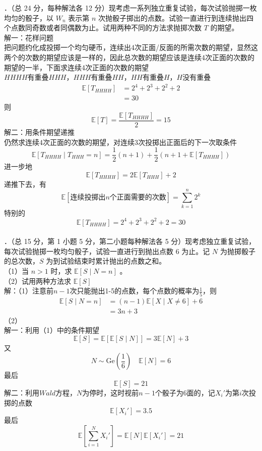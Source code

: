 \documentclass[UTF8]{ctexart}
\begin{document}
．（总 24 分，每种解法各 12 分）现考虑一系列独立重复试验，每次试验抛掷一枚均匀的骰子，以 $W_{n}$ 表示第 $n$ 次抛骰子掷出的点数。试验一直进行到连续抛出四个点数同奇数或者同偶数为止。试用两种不同的方法求抛掷次数 $T$ 的期望。\\
解一：花样问题\\
把问题约化成投掷一个均匀硬币，连续出4次正面/反面的所需次数的期望，显然这两个的次数的期望应该是一样的，因此总次数的期望应该是连续4次正面的次数的期望的一半，下面求连续4次正面的次数的期望\\
$HHHH$有重叠$HHH$，$HHH$有重叠$HH$，$HH$有重叠$H$，$H$没有重叠
\begin{align*}
	\mathbb{E}[T_{HHHH}] & =2^4+2^3+2^2+2 \\
	&=30
\end{align*}
则
\[
\mathbb{E}[T]=\frac{\mathbb{E}[T_{HHHH}]}{2}=15
\]
解二：用条件期望递推\\
仍然求连续4次正面的次数的期望，对连续3次投掷出正面后的下一次取条件
\[
	\mathbb{E}[T_{HHHH}\mid T_{HHH}=n] = \frac{1}{2}(n+1)+\frac{1}{2}\left(n+1+\mathbb{E}[T_{HHHH}] \right)
\]  
进一步地
\[
\mathbb{E}[T_{HHHH}]=2\mathbb{E}\left[T_{HHH} \right]+2 
\]
递推下去，有
\[
\mathbb{E}[\text{连续投掷出}n\text{个正面需要的次数}]=\sum_{k=1}^n 2^k
\]
特别的
\[
\mathbb{E}[T_{HHHH}]=2^4+2^3+2^2+2=30
\]\\



．（总 15 分，第 1 小题 5 分，第二小题每种解法各 5 分）现考虑独立重复试验，每次试验抛掷一枚均匀骰子，试验一直进行到抛出点数 6 为止。记 $N$ 为抛掷骰子的总次数，$S$ 为到试验结束时累计抛出的点数之和。\\
（1）当 $n>1$ 时，求 $\mathbb{E}[S \mid N=n]$ 。\\
（2）试用两种方法求 $\mathbb{E}[S]$\\ 
解：（1）注意前$n-1$次只能抛出1-5的点数，每个点数的概率为$\frac{1}{5}$，则
\begin{align*}
	\mathbb{E}[S \mid N=n] &= (n-1)\mathbb{E}[X\mid X\ne 6]+6 \\
	 & =3n+3
\end{align*}
（2）\\
解一：利用（1）中的条件期望
\[
\mathbb{E}[S]=\mathbb{E}[\mathbb{E}[S\mid N]]=3\mathbb{E}[N]+3
\]
又
\[
N \sim \mathrm{Ge}\left(\frac{1}{6} \right) \quad \mathbb{E}[N]=6 
\]
最后
\[
\mathbb{E}[S]=21
\]
解二：利用$Wald$方程，$N$为停时，这时视前$n-1$个骰子为6面的，记$X_i'$为第$i$次投掷的点数
\[
\mathbb{E}[X_i']=3.5
\]
最后
\[
\mathbb{E}\left[\sum_{i=1}^N X_i' \right]=\mathbb{E}[N] \mathbb{E}[X_i']=21
\]
\end{document}

